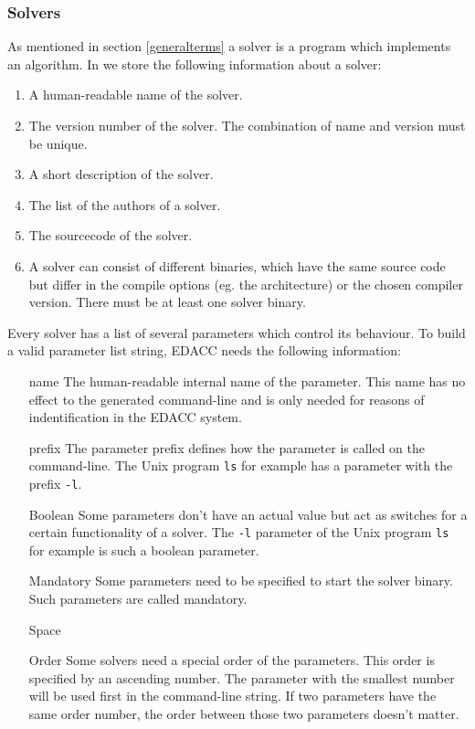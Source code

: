 \subsubsection{Solvers}

 As mentioned in section \ref{generalterms} a solver is a program which implements an algorithm. In \edacc we store the following information about a solver:
\begin{enumerate}
 \item {} A human-readable name of the solver.
 \item{} The version number of the solver. The combination of name and version must be unique.
 \item {} A short description of the solver.
 \item {} The list of the authors of a solver.
 \item {} The sourcecode of the solver.
 \item {} A solver can consist of different binaries, which have the same source code but differ in the compile options (eg. the architecture) or the chosen compiler version. There must be at least one solver binary.
\end{enumerate}

 Every solver has a list of several parameters which control its behaviour. To build a valid parameter list string, EDACC needs the following information:
\begin{enumerate}
 \item[name] The human-readable internal name of the parameter. This name has no effect to the generated command-line and is only needed for reasons of indentification in the EDACC system.
 \item[prefix] The parameter prefix defines how the parameter is called on the command-line. The Unix program \verb|ls| for example has a parameter with the prefix \verb|-l|.
 \item[Boolean] Some parameters don't have an actual value but act as switches for a certain functionality of a solver. The \verb|-l| parameter of the Unix program \verb|ls| for example is such a boolean parameter.
 \item[Mandatory] Some parameters need to be specified to start the solver binary. Such parameters are called mandatory.
 \item[Space]
 \item[Order] Some solvers need a special order of the parameters. This order is specified by an ascending number. The parameter with the smallest number will be used first in the command-line string. If two parameters have the same order number, the order between those two parameters doesn't matter.
\end{enumerate}

